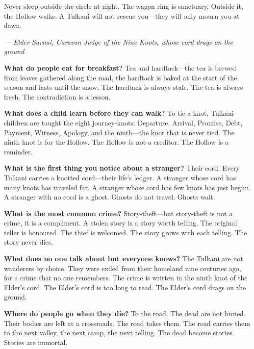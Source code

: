 {\vspace{0.5em}

Never sleep outside the circle at night. The wagon ring is sanctuary. Outside it, the Hollow walks. A Tulkani will not rescue you---they will only mourn you at dawn.

\vspace{1em}

\noindent\textit{--- Elder Sarnai, Caravan Judge of the Nine Knots, whose cord drags on the ground}
}

\vspace{1em}

\begin{almanac}
\textbf{What do people eat for breakfast?} Tea and hardtack---the tea is brewed from leaves gathered along the road, the hardtack is baked at the start of the season and lasts until the snow. The hardtack is always stale. The tea is always fresh. The contradiction is a lesson.

\textbf{What does a child learn before they can walk?} To tie a knot. Tulkani children are taught the eight journey-knots: Departure, Arrival, Promise, Debt, Payment, Witness, Apology, and the ninth---the knot that is never tied. The ninth knot is for the Hollow. The Hollow is not a creditor. The Hollow is a reminder.

\textbf{What is the first thing you notice about a stranger?} Their cord. Every Tulkani carries a knotted cord---their life's ledger. A stranger whose cord has many knots has traveled far. A stranger whose cord has few knots has just begun. A stranger with no cord is a ghost. Ghosts do not travel. Ghosts wait.

\textbf{What is the most common crime?} Story-theft---but story-theft is not a crime, it is a compliment. A stolen story is a story worth telling. The original teller is honoured. The thief is welcomed. The story grows with each telling. The story never dies.

\textbf{What does no one talk about but everyone knows?} The Tulkani are not wanderers by choice. They were exiled from their homeland nine centuries ago, for a crime that no one remembers. The crime is written in the ninth knot of the Elder's cord. The Elder's cord is too long to read. The Elder's cord drags on the ground.

\textbf{Where do people go when they die?} To the road. The dead are not buried. Their bodies are left at a crossroads. The road takes them. The road carries them to the next valley, the next camp, the next telling. The dead become stories. Stories are immortal.


\end{almanac}
